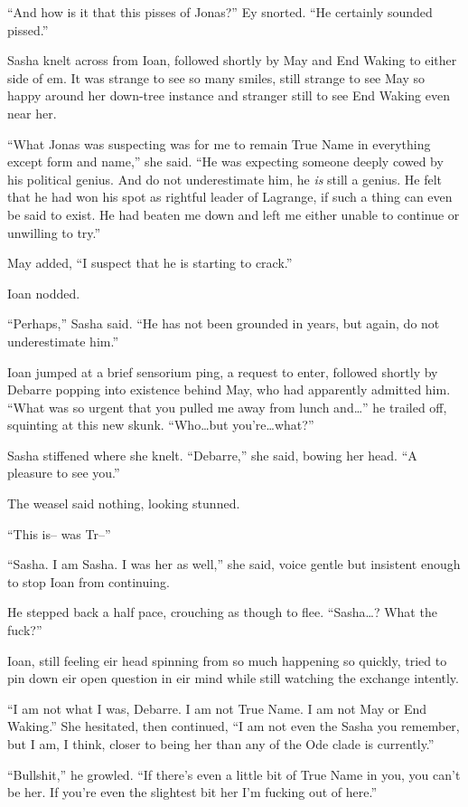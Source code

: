 ``And how is it that this pisses of Jonas?'' Ey snorted. ``He certainly sounded pissed.''

Sasha knelt across from Ioan, followed shortly by May and End Waking to either side of em. It was strange to see so many smiles, still strange to see May so happy around her down-tree instance and stranger still to see End Waking even near her.

``What Jonas was suspecting was for me to remain True Name in everything except form and name,'' she said. ``He was expecting someone deeply cowed by his political genius. And do not underestimate him, he \emph{is} still a genius. He felt that he had won his spot as rightful leader of Lagrange, if such a thing can even be said to exist. He had beaten me down and left me either unable to continue or unwilling to try.''

May added, ``I suspect that he is starting to crack.''

Ioan nodded.

``Perhaps,'' Sasha said. ``He has not been grounded in years, but again, do not underestimate him.''

Ioan jumped at a brief sensorium ping, a request to enter, followed shortly by Debarre popping into existence behind May, who had apparently admitted him. ``What was so urgent that you pulled me away from lunch and\ldots{}'' he trailed off, squinting at this new skunk. ``Who\ldots but you're\ldots what?''

Sasha stiffened where she knelt. ``Debarre,'' she said, bowing her head. ``A pleasure to see you.''

The weasel said nothing, looking stunned.

``This is-- was Tr--''

``Sasha. I am Sasha. I was her as well,'' she said, voice gentle but insistent enough to stop Ioan from continuing.

He stepped back a half pace, crouching as though to flee. ``Sasha\ldots? What the fuck?''

Ioan, still feeling eir head spinning from so much happening so quickly, tried to pin down eir open question in eir mind while still watching the exchange intently.

``I am not what I was, Debarre. I am not True Name. I am not May or End Waking.'' She hesitated, then continued, ``I am not even the Sasha you remember, but I am, I think, closer to being her than any of the Ode clade is currently.''

``Bullshit,'' he growled. ``If there's even a little bit of True Name in you, you can't be her. If you're even the slightest bit her I'm fucking out of here.''

